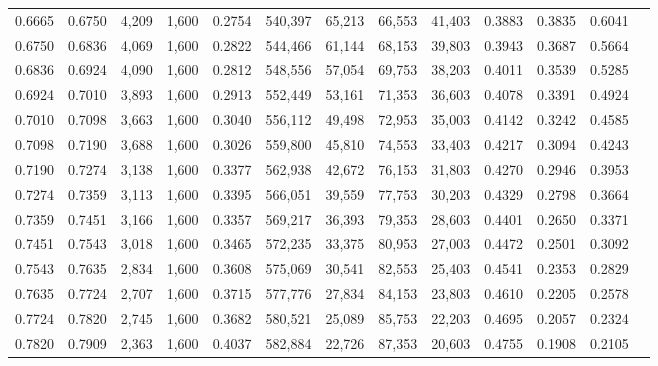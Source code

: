 \begin{tabular}{rrrrrrrrrrrrr}
0.6665 & 0.6750 &  4,209 & 1,600 &                                     0.2754 & 540,397 &  65,213 &  66,553 &  41,403 & 0.3883 & 0.3835 & 0.6041 \\
0.6750 & 0.6836 &  4,069 & 1,600 &                                     0.2822 & 544,466 &  61,144 &  68,153 &  39,803 & 0.3943 & 0.3687 & 0.5664 \\
0.6836 & 0.6924 &  4,090 & 1,600 &                                     0.2812 & 548,556 &  57,054 &  69,753 &  38,203 & 0.4011 & 0.3539 & 0.5285 \\
0.6924 & 0.7010 &  3,893 & 1,600 &                                     0.2913 & 552,449 &  53,161 &  71,353 &  36,603 & 0.4078 & 0.3391 & 0.4924 \\
0.7010 & 0.7098 &  3,663 & 1,600 &                                     0.3040 & 556,112 &  49,498 &  72,953 &  35,003 & 0.4142 & 0.3242 & 0.4585 \\
0.7098 & 0.7190 &  3,688 & 1,600 &                                     0.3026 & 559,800 &  45,810 &  74,553 &  33,403 & 0.4217 & 0.3094 & 0.4243 \\
0.7190 & 0.7274 &  3,138 & 1,600 &                                     0.3377 & 562,938 &  42,672 &  76,153 &  31,803 & 0.4270 & 0.2946 & 0.3953 \\
0.7274 & 0.7359 &  3,113 & 1,600 &                                     0.3395 & 566,051 &  39,559 &  77,753 &  30,203 & 0.4329 & 0.2798 & 0.3664 \\
0.7359 & 0.7451 &  3,166 & 1,600 &                                     0.3357 & 569,217 &  36,393 &  79,353 &  28,603 & 0.4401 & 0.2650 & 0.3371 \\
0.7451 & 0.7543 &  3,018 & 1,600 &                                     0.3465 & 572,235 &  33,375 &  80,953 &  27,003 & 0.4472 & 0.2501 & 0.3092 \\
0.7543 & 0.7635 &  2,834 & 1,600 &                                     0.3608 & 575,069 &  30,541 &  82,553 &  25,403 & 0.4541 & 0.2353 & 0.2829 \\
0.7635 & 0.7724 &  2,707 & 1,600 &                                     0.3715 & 577,776 &  27,834 &  84,153 &  23,803 & 0.4610 & 0.2205 & 0.2578 \\
0.7724 & 0.7820 &  2,745 & 1,600 &                                     0.3682 & 580,521 &  25,089 &  85,753 &  22,203 & 0.4695 & 0.2057 & 0.2324 \\
0.7820 & 0.7909 &  2,363 & 1,600 &                                     0.4037 & 582,884 &  22,726 &  87,353 &  20,603 & 0.4755 & 0.1908 & 0.2105 \\

\end{tabular}

